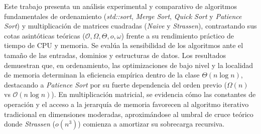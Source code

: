 Este trabajo presenta un análisis experimental y comparativo de algoritmos fundamentales de ordenamiento (\textit{std::sort}, \textit{Merge Sort}, \textit{Quick Sort} y \textit{Patience Sort}) y multiplicación de matrices cuadradas (\textit{Naive} y \textit{Strassen}), contrastando sus cotas asintóticas teóricas ($\mathcal{O}, \Omega, \Theta, o, \omega$) frente a su rendimiento práctico de tiempo de CPU y memoria. Se evalúa la sensibilidad de los algoritmos ante el tamaño de las entradas, dominios y estructuras de datos. Los resultados demuestran que, en ordenamiento, las optimizaciones de bajo nivel y la localidad de memoria determinan la eficiencia empírica dentro de la clase $\Theta(n \log n)$, destacando a \textit{Patience Sort} por su fuerte dependencia del orden previo ($\Omega(n)$ vs $\mathcal{O}(n \log n)$). En multiplicación matricial, se evidencia cómo las constantes de operación y el acceso a la jerarquía de memoria favorecen al algoritmo iterativo tradicional en dimensiones moderadas, aproximándose al umbral de cruce teórico donde \textit{Strassen} ($o(n^3)$) comienza a amortizar su sobrecarga recursiva.